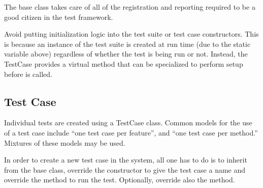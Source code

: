 \documentclass[letterpaper,10pt,english]{sphinxmanual}
\renewcommand{\sphinxcode}[1]{\texttt{\small{#1}}}
\begin{document}
\begin{sphinxVerbatim}[commandchars=\\\{\}]
    
   

 
     
     

  
\end{sphinxVerbatim}

The base class takes care of all of the registration and reporting required to
be a good citizen in the test framework.

Avoid putting initialization logic into the test suite or test case
constructors.  This is
because an instance of the test suite is created at run time
(due to the static variable above) regardless of whether the test is being
run or not.  Instead, the TestCase provides a virtual \sphinxcode{} method
that can be specialized to perform setup before \sphinxcode{} is called.


\subsection{Test Case}
\label{\detokenize{test-framework:test-case}}
Individual tests are created using a TestCase class.  Common models for the use
of a test case include “one test case per feature”, and “one test case per method.”
Mixtures of these models may be used.

In order to create a new test case in the system, all one has to do is to inherit
from the  \sphinxcode{} base class, override the constructor to give the test
case a name and override the \sphinxcode{} method to run the test.  Optionally,
override also the \sphinxcode{} method.
\end{document}
